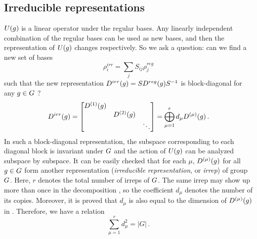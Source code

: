 \subsection{Irreducible representations}

$U(g)$ is a linear operator under the regular bases.
Any linearly independent combination of the regular bases can be used as
new bases, and then the representation of $U(g)$ changes respectively.
So we ask a question: can we find a new set of bases
\begin{equation}
  \rho^{irr}_i=\sum_j S_{ij}\rho^{reg}_j
  \label{eq:trans}
\end{equation}
such that the new representation $D^{irr}(g) = SD^{reg}(g)S^{-1}$ is block-diagonal
for any $g\in G$ ?
\begin{equation}
  D^{irr}(g) =
  \begin{bmatrix}
    D^{(1)}(g) & & \\
    & D^{(2)}(g) & \\
    & & \ddots \\
  \end{bmatrix}
  = \bigoplus_{\mu=1}^{r} d_\mu D^{(\mu)}(g)
  \,.
  \label{eq:irre}
\end{equation}
In such a block-diagonal representation, the
subspace corresponding to each diagonal block is invariant under $G$
and the action of $U(g)$ can be analyzed subspace by subspace.
It can be easily checked that for each $\mu$, $D^{(\mu)}(g)$ for all
$g\in G$ form another representation (\emph{irreducible
  representation}, or \emph{irrep}) of group $G$.
Here, $r$ denotes the total number of
irreps of $G$. The same irrep may show up more than once in the decomposition
, so the coefficient $d_{\mu}$ denotes the number of its
copies.  Moreover, it is proved that $d_{\mu}$ is also equal to the dimension
of $D^{(\mu)}(g)$ in .
Therefore, we have a relation
\[
  \sum_{\mu=1}^r d_\mu^2 = |G|
  \,.
\]

